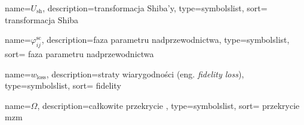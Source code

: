 {
    name=\ensuremath{U_{\mathrm{sh}}},
    description={transformacja Shiba'y},
    type=symbolslist,
    sort= transformacja Shiba
}

{
    name=\ensuremath{\varphi^{\mathrm{sc}}_{ij}},
    description={faza parametru nadprzewodnictwa},
    type=symbolslist,
    sort= faza parametru nadprzewodnictwa
}

{
    name=\ensuremath{w_{\mathrm{loss}}},
    description={straty wiarygodności (eng. \textit{fidelity loss})},
    type=symbolslist,
    sort= fidelity
}

{
    name=\ensuremath{\Omega},
    description={całkowite przekrycie \MZM},
    type=symbolslist,
    sort= przekrycie mzm
}
